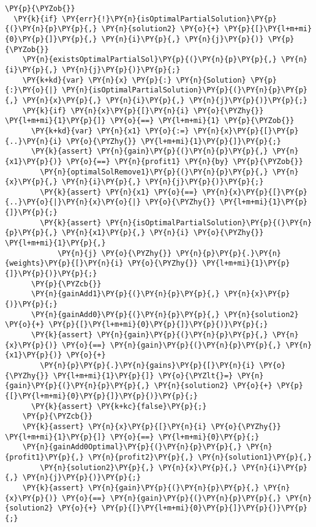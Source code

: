 \begin{sloppypar}
\begin{enumerate}
\begin{Verbatim}[commandchars=\\\{\}]
\PY{p}{\PYZob{}}
  \PY{k}{if} \PY{err}{!}\PY{n}{isOptimalPartialSolution}\PY{p}{(}\PY{n}{p}\PY{p}{,} \PY{n}{solution2} \PY{o}{+} \PY{p}{[}\PY{l+m+mi}{0}\PY{p}{]}\PY{p}{,} \PY{n}{i}\PY{p}{,} \PY{n}{j}\PY{p}{)} \PY{p}{\PYZob{}}
    \PY{n}{existsOptimalPartialSol}\PY{p}{(}\PY{n}{p}\PY{p}{,} \PY{n}{i}\PY{p}{,} \PY{n}{j}\PY{p}{)}\PY{p}{;}
    \PY{k+kd}{var} \PY{n}{x} \PY{p}{:} \PY{n}{Solution} \PY{p}{:}\PY{o}{|} \PY{n}{isOptimalPartialSolution}\PY{p}{(}\PY{n}{p}\PY{p}{,} \PY{n}{x}\PY{p}{,} \PY{n}{i}\PY{p}{,} \PY{n}{j}\PY{p}{)}\PY{p}{;}
    \PY{k}{if} \PY{n}{x}\PY{p}{[}\PY{n}{i} \PY{o}{\PYZhy{}} \PY{l+m+mi}{1}\PY{p}{]} \PY{o}{==} \PY{l+m+mi}{1} \PY{p}{\PYZob{}}
      \PY{k+kd}{var} \PY{n}{x1} \PY{o}{:=} \PY{n}{x}\PY{p}{[}\PY{p}{..}\PY{n}{i} \PY{o}{\PYZhy{}} \PY{l+m+mi}{1}\PY{p}{]}\PY{p}{;}
      \PY{k}{assert} \PY{n}{gain}\PY{p}{(}\PY{n}{p}\PY{p}{,} \PY{n}{x1}\PY{p}{)} \PY{o}{==} \PY{n}{profit1} \PY{n}{by} \PY{p}{\PYZob{}}
        \PY{n}{optimalSolRemove1}\PY{p}{(}\PY{n}{p}\PY{p}{,} \PY{n}{x}\PY{p}{,} \PY{n}{i}\PY{p}{,} \PY{n}{j}\PY{p}{)}\PY{p}{;}
        \PY{k}{assert} \PY{n}{x1} \PY{o}{==} \PY{n}{x}\PY{p}{[}\PY{p}{..}\PY{o}{|}\PY{n}{x}\PY{o}{|} \PY{o}{\PYZhy{}} \PY{l+m+mi}{1}\PY{p}{]}\PY{p}{;}
        \PY{k}{assert} \PY{n}{isOptimalPartialSolution}\PY{p}{(}\PY{n}{p}\PY{p}{,} \PY{n}{x1}\PY{p}{,} \PY{n}{i} \PY{o}{\PYZhy{}} \PY{l+m+mi}{1}\PY{p}{,} 
            \PY{n}{j} \PY{o}{\PYZhy{}} \PY{n}{p}\PY{p}{.}\PY{n}{weights}\PY{p}{[}\PY{n}{i} \PY{o}{\PYZhy{}} \PY{l+m+mi}{1}\PY{p}{]}\PY{p}{)}\PY{p}{;}
      \PY{p}{\PYZcb{}}
      \PY{n}{gainAdd1}\PY{p}{(}\PY{n}{p}\PY{p}{,} \PY{n}{x}\PY{p}{)}\PY{p}{;}
      \PY{n}{gainAdd0}\PY{p}{(}\PY{n}{p}\PY{p}{,} \PY{n}{solution2} \PY{o}{+} \PY{p}{[}\PY{l+m+mi}{0}\PY{p}{]}\PY{p}{)}\PY{p}{;}
      \PY{k}{assert} \PY{n}{gain}\PY{p}{(}\PY{n}{p}\PY{p}{,} \PY{n}{x}\PY{p}{)} \PY{o}{==} \PY{n}{gain}\PY{p}{(}\PY{n}{p}\PY{p}{,} \PY{n}{x1}\PY{p}{)} \PY{o}{+} 
        \PY{n}{p}\PY{p}{.}\PY{n}{gains}\PY{p}{[}\PY{n}{i} \PY{o}{\PYZhy{}} \PY{l+m+mi}{1}\PY{p}{]} \PY{o}{\PYZlt{}=} \PY{n}{gain}\PY{p}{(}\PY{n}{p}\PY{p}{,} \PY{n}{solution2} \PY{o}{+} \PY{p}{[}\PY{l+m+mi}{0}\PY{p}{]}\PY{p}{)}\PY{p}{;}
      \PY{k}{assert} \PY{k+kc}{false}\PY{p}{;}
    \PY{p}{\PYZcb{}}
    \PY{k}{assert} \PY{n}{x}\PY{p}{[}\PY{n}{i} \PY{o}{\PYZhy{}} \PY{l+m+mi}{1}\PY{p}{]} \PY{o}{==} \PY{l+m+mi}{0}\PY{p}{;}
    \PY{n}{gainAdd0Optimal}\PY{p}{(}\PY{n}{p}\PY{p}{,} \PY{n}{profit1}\PY{p}{,} \PY{n}{profit2}\PY{p}{,} \PY{n}{solution1}\PY{p}{,} 
        \PY{n}{solution2}\PY{p}{,} \PY{n}{x}\PY{p}{,} \PY{n}{i}\PY{p}{,} \PY{n}{j}\PY{p}{)}\PY{p}{;}
    \PY{k}{assert} \PY{n}{gain}\PY{p}{(}\PY{n}{p}\PY{p}{,} \PY{n}{x}\PY{p}{)} \PY{o}{==} \PY{n}{gain}\PY{p}{(}\PY{n}{p}\PY{p}{,} \PY{n}{solution2} \PY{o}{+} \PY{p}{[}\PY{l+m+mi}{0}\PY{p}{]}\PY{p}{)}\PY{p}{;}

\end{Verbatim}
\end{enumerate}
\end{sloppypar}
